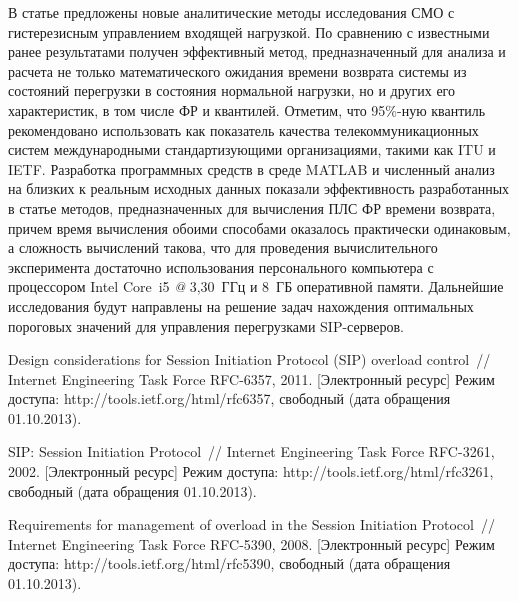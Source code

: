 \begin{multicols}{2}
В статье предложены новые аналитические методы исследования СМО с
гистерезисным управ\-ле\-ни\-ем входящей нагрузкой. По сравнению с
известными ранее результатами получен эффективный метод,
предназначенный для анализа и расчета не только математического
ожидания времени возврата системы из состояний перегрузки в
состояния нормальной нагрузки, но и других его характеристик, в том
числе ФР и квантилей. Отметим, что 95\%-ную квантиль рекомендовано
использовать как показатель качества телекоммуникационных систем
международными стандартизующими организациями, такими как ITU и
IETF. Разработка программных средств в среде MATLAB и чис\-лен\-ный
анализ на близких к реальным исходных данных показали эффективность
разработанных в статье методов, предназначенных для вы\-чис\-ле\-ния ПЛС
ФР времени возврата, причем время вы\-чис\-ле\-ния обоими способами
оказалось практически одинаковым, а сложность вычислений такова, что
для проведения вычислительного эксперимента достаточно использования
персонального компьютера с процессором Intel Core~i5 {\it @} 3,30~ГГц и 
8~ГБ оперативной памяти. Дальнейшие исследования будут
направлены на решение задач нахождения оптимальных пороговых
значений для управления перегрузками SIP-сер\-веров.

\vspace*{-6pt}

{\small\frenchspacing
{%
\begin{thebibliography}{99}

\vspace*{-2pt}


Design considerations for Session Initiation
Protocol (SIP) overload control~// Internet Engineering Task Force
\mbox{RFC-6357}, 2011. [Электронный ресурс] Режим \mbox{доступа}:
{\sf http://tools.ietf.org/html/rfc6357}, свободный
(дата обращения 01.10.2013).

SIP: Session  Initiation  Protocol~// Internet Engineering Task Force
RFC-3261, 2002. [Электронный ресурс] Режим доступа:
{\sf http://tools.ietf.org/html/rfc3261}, свободный (дата обращения 01.10.2013).

Requirements for management of overload in the
Session Initiation Protocol~// Internet Engineering Task Force
RFC-5390, 2008. [Электронный ресурс] Режим доступа:
{\sf http://tools.ietf.org/html/rfc5390}, свободный
(дата обращения 01.10.2013).


\end{thebibliography}}}
\end{multicols}
